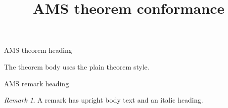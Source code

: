 \documentclass[aspectratio=169]{beamer}
\title{AMS theorem conformance}
\date{}
\theoremstyle{remark}
\newtheorem{remark}[theorem]{Remark}
\begin{document}
\begin{frame}{AMS theorem heading}
  \begin{theorem}
    The theorem body uses the plain theorem style.
  \end{theorem}
\end{frame}

\begin{frame}{AMS remark heading}
  \begin{remark}
    A remark has upright body text and an italic heading.
  \end{remark}
\end{frame}
\end{document}
